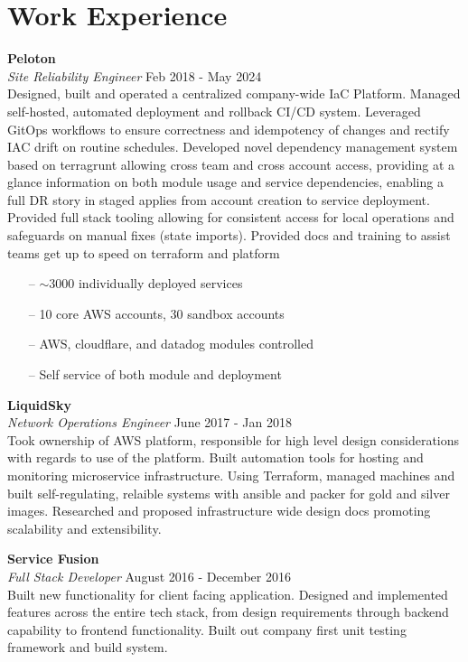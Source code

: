 \section{Work Experience}

\large{\textbf{Peloton}} \\
\textit{Site Reliability Engineer} \hfill Feb 2018 - May 2024 \\[3.75pt]
Designed, built and operated a centralized company-wide IaC Platform. Managed self-hosted, automated deployment and rollback CI/CD system. Leveraged GitOps workflows to ensure correctness and idempotency of changes and rectify IAC drift on routine schedules. Developed novel dependency management system based on terragrunt allowing cross team and cross account access, providing at a glance information on both module usage and service dependencies, enabling a full DR story in staged applies from account creation to service deployment. Provided full stack tooling allowing for consistent access for local operations and safeguards on manual fixes (state imports). Provided docs and training to assist teams get up to speed on terraform and platform


\begin{minipage}[t]{\linewidth}
    \begin{itemize}
        \item[--] $\sim$3000 individually deployed services
        \item[--] 10 core AWS accounts, 30 sandbox accounts
        \item[--] AWS, cloudflare, and datadog modules controlled
        \item[--] Self service of both module and deployment
    \end{itemize}
    \end{minipage}

\large{\textbf{LiquidSky}} \\
\textit{Network Operations Engineer} \hfill June 2017 - Jan 2018 \\[3.75pt]
Took ownership of AWS platform, responsible for high level design considerations with regards to use of the platform. Built automation tools for hosting and monitoring microservice infrastructure. Using Terraform, managed machines and built self-regulating, relaible systems with ansible and packer for gold and silver images. Researched and proposed infrastructure wide design docs promoting scalability and extensibility.

\large{\textbf{Service Fusion}} \\
\textit{Full Stack Developer} \hfill August 2016 - December 2016 \\[3.75pt]
Built new functionality for client facing application. Designed and implemented features across the entire tech stack, from design requirements through backend capability to frontend functionality. Built out company first unit testing framework and build system.

